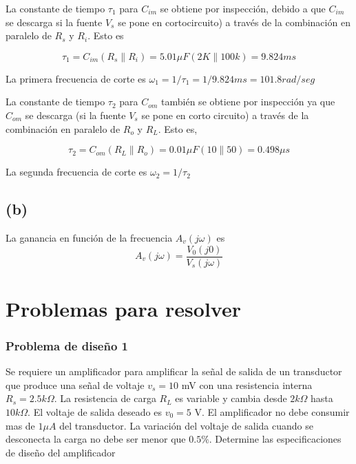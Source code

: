\documentclass[12pt]{book}
\theoremstyle{definition}
\theoremstyle{remark}
\theoremstyle{plain}
\begin{document}
La constante de tiempo $\tau _{1}$ para $C_{im}$ se obtiene por inspección, debido a que $C_{im}$ se descarga si la fuente $V_{s}$ se pone en cortocircuito) a través de la combinación en paralelo de $R_{s}$ y $R_{i}$. Esto es

\begin{equation}
\tau _{1}=C_{im}   (R_{s}\parallel R_{i})=5.01 \mu F (2K \parallel 100k)=9.824 ms
\label{equ1012}
\end{equation}

La primera frecuencia de corte es $\omega _{1}=1/ \tau _{1}=1/9.824 ms=101.8 rad/seg$

La constante de tiempo $\tau _{2}$ para $C_{om}$ también se obtiene por inspección ya que $C_{om}$ se descarga (si la fuente $V_{s}$ se pone en corto circuito) a través de la combinación en paralelo de $R_{o}$ y $R_{L}$. Esto es,

\begin{equation}
\tau _{2}=C_{om}(R_{L} \parallel R_{o})=0.01 \mu F (10\parallel 50)=0.498 \mu s
\label{equ1013}
\end{equation}

La segunda frecuencia de corte es $\omega _{2}=1/\tau _{2}$

\subsection{(b)}

La ganancia en función de la frecuencia $A_{v}(j\omega)$ es
\begin{equation}
A_{v}(j\omega)= \frac{V_{0}(j 0)}{V_{s}(j \omega)}
\label{equ1014}
\end{equation}


\section{Problemas para resolver}

\subsubsection{Problema de diseño 1}

Se requiere un amplificador para amplificar la señal de salida de un transductor que produce una señal de voltaje $v_s=10$ mV con una resistencia interna $R_s=2.5 k \Omega$. La resistencia de carga $R_L$ es variable y cambia desde $2 k \Omega$ hasta $10 k \Omega$. El voltaje de salida deseado es $v_0=5 $ V. El amplificador no debe consumir mas de $1 \mu A$ del transductor. La variación del voltaje de salida cuando se desconecta la carga no debe ser menor que $0.5\%$. Determine las especificaciones de diseño del amplificador
\end{document}
